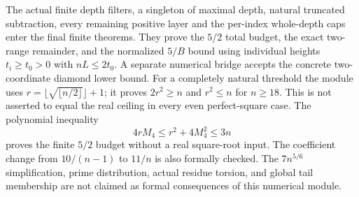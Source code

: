 The actual finite depth filters, a singleton of maximal depth,
natural truncated subtraction, every remaining positive layer and
the per-index whole-depth caps enter the final finite theorems.
They prove the \(5/2\) total budget, the exact two-range remainder,
and the normalized \(5/B\) bound using individual heights
\(t_i\geq t_0>0\) with \(nL\leq2t_0\). A separate numerical bridge
accepts the concrete two-coordinate diamond lower bound.
For a completely natural threshold the module uses
\(r=\lfloor\sqrt{\lfloor n/2\rfloor}\rfloor+1\); it proves
\(2r^2\geq n\) and \(r^2\leq n\) for \(n\geq18\).
This is not asserted to equal the real ceiling in every even
perfect-square case. The polynomial inequality
\[
 4rM_4\leq r^2+4M_4^2\leq3n
\]
proves the finite \(5/2\) budget without a real square-root input.
The coefficient change from \(10/(n-1)\) to \(11/n\) is also
formally checked. The \(7n^{5/6}\) simplification, prime
distribution, actual residue torsion, and global tail membership
are not claimed as formal consequences of this numerical module.
